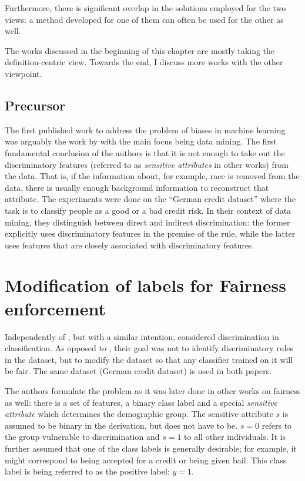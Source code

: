 Furthermore, there is significant overlap in the solutions employed for the two views:
a method developed for one of them can often be used for the other as well.

The works discussed in the beginning of this chapter are mostly taking the definition-centric view.
Towards the end, I discuss more works with the other viewpoint.

\subsection{Precursor}\label{precursor}
The first published work to address the problem of biases in machine learning
was arguably the work by \citet{pedreshi2008discrimination}
with the main focus being data mining.
The first fundamental conclusion of the authors
is that it is not enough to take out the discriminatory features
(referred to as \emph{sensitive attributes} in other works) from the data.
That is, if the information about, for example, race
is removed from the data,
there is usually enough background information to reconstruct that attribute.
The experiments were done on the ``German credit dataset''
where the task is to classify people as a good or a bad credit risk.
In their context of data mining,
they distinguish between direct and indirect discrimination:
the former explicitly uses discriminatory features in the premise of the rule,
while the latter uses features that are closely associated with discriminatory features.

\section{Modification of labels for Fairness enforcement}\label{modification-of-labels-for-fairness-enforcement}
Independently of \citet{pedreshi2008discrimination}, but with a similar intention,
\citet{kamiran2009classifying} considered discrimination in classification.
As opposed to \citet{pedreshi2008discrimination}, their goal was not to identify discriminatory rules in the dataset,
but to modify the dataset so that any classifier trained on it will be fair.
The same dataset (German credit dataset) is used in both papers.

The authors formulate the problem as it was later done in other works on fairness as well:
there is a set of features, a binary class label
and a special \emph{sensitive attribute} which determines the demographic group.
The sensitive attribute \(s\) is assumed to be binary in the derivation,
but does not have to be.
\(s=0\) refers to the group vulnerable to discrimination and \(s=1\) to all other individuals.
It is further assumed that one of the class labels is generally desirable;
for example, it might correspond to being accepted for a credit or being given bail.
This class label is being referred to as the positive label: \(y = 1\).

